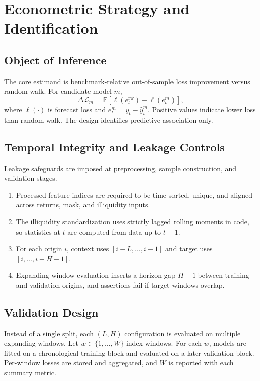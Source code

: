 \section{Econometric Strategy and Identification}

\subsection{Object of Inference}
The core estimand is benchmark-relative out-of-sample loss improvement versus random walk. For candidate model \(m\),
\begin{equation}
\Delta \mathcal{L}_{m} = \mathbb{E}\!\left[\ell\!\left(e_t^{\mathrm{rw}}\right)-\ell\!\left(e_t^{m}\right)\right],
\end{equation}
where \(\ell(\cdot)\) is forecast loss and \(e_t^{m}=y_t-\hat{y}_t^{m}\). Positive values indicate lower loss than random walk. The design identifies predictive association only.

\subsection{Temporal Integrity and Leakage Controls}
Leakage safeguards are imposed at preprocessing, sample construction, and validation stages.
\begin{enumerate}
  \item Processed feature indices are required to be time-sorted, unique, and aligned across returns, mask, and illiquidity inputs.
  \item The illiquidity standardization uses strictly lagged rolling moments in code, so statistics at \(t\) are computed from data up to \(t-1\).
  \item For each origin \(i\), context uses \([i-L,\ldots,i-1]\) and target uses \([i,\ldots,i+H-1]\).
  \item Expanding-window evaluation inserts a horizon gap \(H-1\) between training and validation origins, and assertions fail if target windows overlap.
\end{enumerate}

\subsection{Validation Design}
Instead of a single split, each \((L,H)\) configuration is evaluated on multiple expanding windows. Let \(w\in\{1,\ldots,W\}\) index windows. For each \(w\), models are fitted on a chronological training block and evaluated on a later validation block. Per-window losses are stored and aggregated, and \(W\) is reported with each summary metric.

